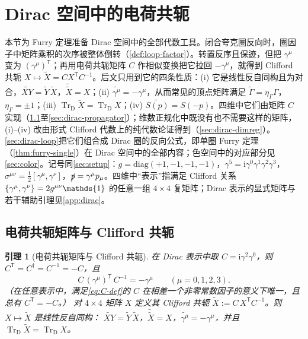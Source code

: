\documentclass[UTF8,a4paper,11pt,fontset=fandol]{ctexart}
\let\amsmathbb\mathbb
\renewcommand{\mathbb}[1]{\ifx1#1\mathds{1}\else\amsmathbb{#1}\fi}
\theoremstyle{cplain}
\newtheorem{lemma}[theorem]{引理}
\theoremstyle{cdefinition}
\theoremstyle{cremark}
\numberwithin{equation}{section}
\newcommand{\TrD}{\operatorname{Tr}_{\mathrm{D}}}   %
\newcommand{\sla}[1]{\slashed{#1}}                  %
\newcommand{\tp}{\mathsf{T}}                         %
\newcommand{\ii}{\mathrm{i}}                        %
\newcommand{\Cconj}[1]{\widetilde{#1}}              %
\begin{document}
\section{Dirac 空间中的电荷共轭}\label{sec:dirac}

本节为 Furry 定理准备 Dirac 空间中的全部代数工具。闭合夸克圈反向时，圈因子中矩阵乘积的次序被整体倒转（\cref{def:loop-factor}）。转置反序且保迹，但把 $\gamma^\mu$ 变为 $(\gamma^\mu)^{\tp}$；再用电荷共轭矩阵 $C$ 作相似变换把它拉回 $-\gamma^\mu$，就得到 Clifford 共轭 $X\mapsto\Cconj X=CX^{\tp}C^{-1}$。后文只用到它的四条性质：(i) 它是线性反自同构且为对合，$\Cconj{XY}=\Cconj Y\,\Cconj X$，$\Cconj{\Cconj X}=X$；(ii) $\Cconj{\gamma^\mu}=-\gamma^\mu$，从而常见的顶点矩阵满足 $\Cconj\Gamma=\eta_\Gamma\Gamma$，$\eta_\Gamma=\pm1$；(iii) $\TrD\Cconj X=\TrD X$；(iv) $\Cconj{S(p)}=S(-p)$。四维中它们由矩阵 $C$ 实现（\cref{sec:dirac-cmatrix}至\cref{sec:dirac-propagator}）；维数正规化中既没有也不需要这样的矩阵，(i)--(iv) 改由形式 Clifford 代数上的纯代数论证得到（\cref{sec:dirac-dimreg}）。\cref{sec:dirac-loop}把它们组合成 Dirac 圈的反向公式，即单圈 Furry 定理（\cref{thm:furry-single}）在 Dirac 空间中的全部内容；色空间中的对应部分见\cref{sec:color}。记号同\cref{sec:setup}：$g=\mathrm{diag}(+1,-1,-1,-1)$，$\gamma^5=\ii\gamma^0\gamma^1\gamma^2\gamma^3$，$\sigma^{\mu\nu}=\tfrac{\ii}{2}[\gamma^\mu,\gamma^\nu]$，$\sla p=\gamma^\mu p_\mu$。四维中“表示”指满足 Clifford 关系 $\{\gamma^\mu,\gamma^\nu\}=2g^{\mu\nu}\mathbb 1$ 的任意一组 $4\times4$ 复矩阵；Dirac 表示的显式矩阵与若干辅助引理见\cref{app:dirac}。

\subsection{电荷共轭矩阵与 Clifford 共轭}\label{sec:dirac-cmatrix}

\begin{lemma}[电荷共轭矩阵与 Clifford 共轭]\label{lem:C-matrix}
在 Dirac 表示中取 $C=\ii\gamma^2\gamma^0$，则 $C^{\tp}=C^\dagger=C^{-1}=-C$，且
\begin{equation}\label{eq:C-def}
C\,(\gamma^\mu)^{\tp}\,C^{-1}=-\gamma^\mu\qquad(\mu=0,1,2,3).
\end{equation}
（在任意表示中，满足\cref{eq:C-def}的 $C$ 在相差一个非零常数因子的意义下唯一，且总有 $C^{\tp}=-C$。）
对 $4\times4$ 矩阵 $X$ 定义其 Clifford 共轭 $\Cconj X:=C\,X^{\tp}C^{-1}$。则 $X\mapsto\Cconj X$ 是线性反自同构：
$\Cconj{XY}=\Cconj Y\,\Cconj X$，$\Cconj{\Cconj X}=X$，$\Cconj{\gamma^\mu}=-\gamma^\mu$，并且 $\TrD\Cconj X=\TrD X$。
\end{lemma}
\end{document}
